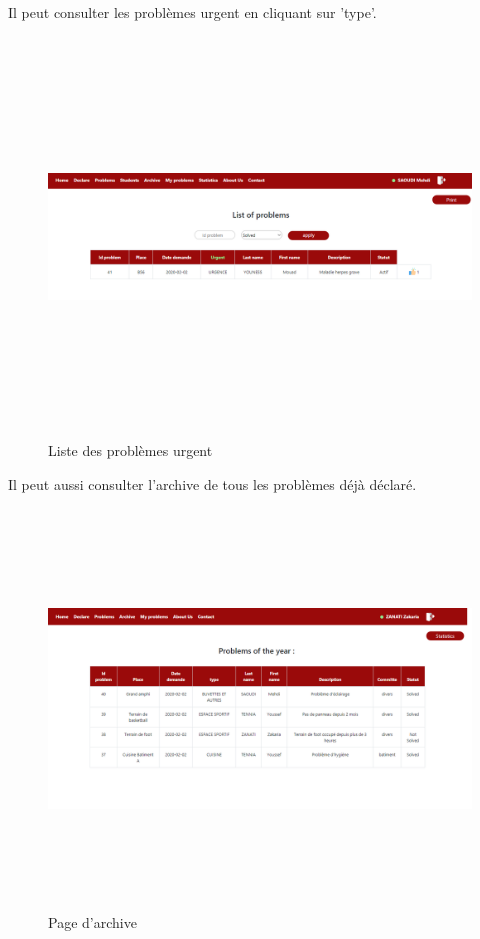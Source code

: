 \documentclass[11.5pt]{report}
\begin{document}
\newpage
Il peut consulter les problèmes urgent en cliquant sur 'type'.\\
\begin{figure}[h]
	
	\begin{center}
		\includegraphics[width=500pt,height=300pt]{urgence.png} 
		\caption{Liste des problèmes urgent}
	\end{center}
	
\end{figure}
\newpage
Il peut aussi consulter l'archive de tous les problèmes déjà déclaré.\\
\begin{figure}[h]
	
	\begin{center}
		\includegraphics[width=500pt,height=300pt]{archive.png} 
		\caption{Page d'archive}
	\end{center}
	
\end{figure}
\end{document}
